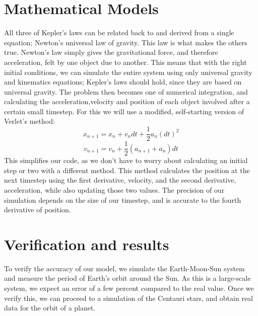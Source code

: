 \documentclass[12pt]{article}
\begin{document}
\section{Mathematical Models}
All three of Kepler’s laws can be related back to and derived from a single equation; Newton’s universal law of gravity. This law is what makes the others true. Newton’s law simply gives the gravitational force, and therefore acceleration, felt by one object due to another. This means that with the right initial conditions, we can simulate the entire system using only universal gravity and kinematics equations; Kepler’s laws should hold, since they are based on universal gravity. The problem then becomes one of numerical integration, and calculating the acceleration,velocity and position of each object involved after a certain small timestep. For this we will use a modified, self-starting version of Verlet’s method: \[x_{n+1} = x_{n} + v_{n}dt + \frac{1}{2}a_{n}(dt)^{2}\]
\[v_{n+1} = v_{n} + \frac{1}{2}(a_{n+1} + a_{n})dt\]
This simplifies our code, as we don’t have to worry about calculating an initial step or two with a different method. This method calculates the position at the next timestep using the first derivative, velocity, and the second derivative, acceleration, while also updating those two values. The precision of our simulation depends on the size of our timestep, and is accurate to the fourth derivative of position.

\section{Verification and results}
To verify the accuracy of our model, we simulate the Earth-Moon-Sun system and measure the period of Earth’s orbit around the Sun. As this is a large-scale system, we expect an error of a few percent compared to the real value. Once we verify this, we can proceed to a simulation of the Centauri stars, and obtain real data for the orbit of a planet.
\end{document}
